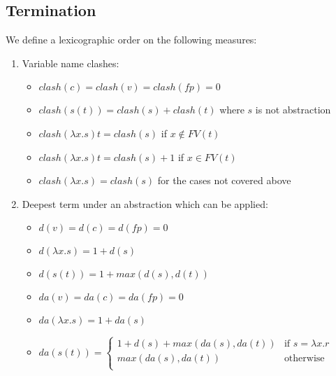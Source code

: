 \documentclass[a4paper]{article}
\begin{document}
\subsection{Termination}
\label{sec:termination}

We define a lexicographic order on the following measures:

\begin{enumerate}
\item Variable name clashes:
  \begin{itemize}
  \item $clash(c)=clash(v)=clash(fp)=0$
  \item $clash(s(t)) = clash(s) + clash(t)$ where $s$ is not abstraction
  \item $clash(\lambda x . s) t = clash(s)$ if $x \not \in FV(t)$
  \item $clash(\lambda x . s) t = clash(s) + 1$ if $x \in FV(t)$
  \item $clash(\lambda x . s) = clash(s)$ for the cases not covered above
  \end{itemize}

% 

  
\item Deepest term under an abstraction which can be applied:
  \begin{itemize}
  \item $d(v)=d(c)=d(fp)=0$
  \item $d(\lambda x . s)=1 + d(s)$
  \item $d(s(t))= 1 + max(d(s), d(t))$
  \end{itemize}

  \begin{itemize}
  \item $da(v)=da(c)=da(fp)=0$
  \item $da(\lambda x . s)=1 + da(s)$
  \item $da(s(t))= \left\{
      \begin{array}{rl}
        1 + d(s) + max(da(s),da(t))&\mbox{if }s=\lambda x.r\\
        max(da(s),da(t))&\mbox{otherwise}\\
      \end{array}\right.$
  \end{itemize}

\end{enumerate}
\end{document}
